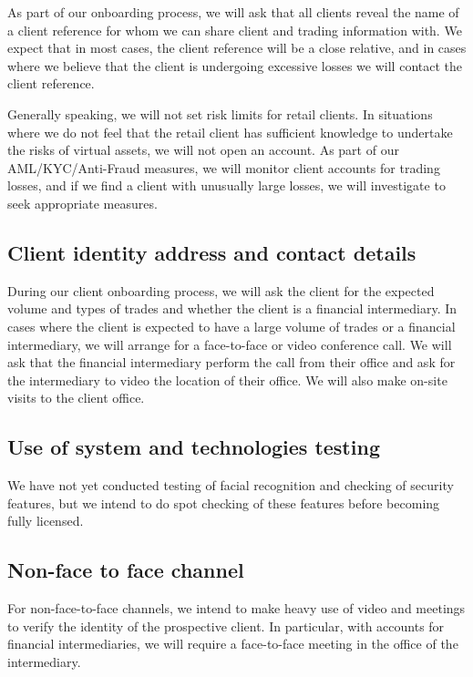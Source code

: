 As part of our onboarding process, we will ask that all clients reveal
the name of a client reference for whom we can share client and
trading information with.  We expect that in most cases, the client
reference will be a close relative, and in cases where we believe that
the client is undergoing excessive losses we will contact the client
reference.

Generally speaking, we will not set risk limits for retail clients.  In
situations where we do not feel that the retail client has sufficient
knowledge to undertake the risks of virtual assets, we will not open
an account.  As part of our AML/KYC/Anti-Fraud measures, we will
monitor client accounts for trading losses, and if we find a client
with unusually large losses, we will investigate to seek appropriate
measures.

\subsection{Client identity address and contact details}
During our client onboarding process, we will ask the client for the
expected volume and types of trades and whether the client is a
financial intermediary.  In cases where the client is expected to have
a large volume of trades or a financial intermediary, we will arrange
for a face-to-face or video conference call.  We will ask that the
financial intermediary perform the call from their office and ask for the
intermediary to video the location of their office.  We will also make
on-site visits to the client office.

\subsection{Use of system and technologies testing}
We have not yet conducted testing of facial recognition and checking
of security features, but we intend to do spot checking of these
features before becoming fully licensed.

\subsection{Non-face to face channel}
For non-face-to-face channels, we intend to make heavy use of video and
meetings to verify the identity of the
prospective client.  In particular, with accounts for financial
intermediaries, we will require a face-to-face meeting in the office of
the intermediary.

